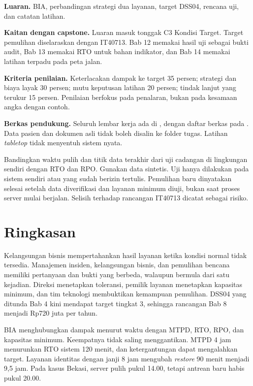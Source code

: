 \textbf{Luaran.} BIA, perbandingan strategi dua layanan, target DSS04, rencana uji, dan catatan
latihan.

\textbf{Kaitan dengan capstone.} Luaran masuk tonggak C3 Kondisi Target. Target pemulihan
diselaraskan dengan IT40713. Bab 12 memakai hasil uji sebagai bukti audit, Bab 13 memakai RTO untuk
bahan indikator, dan Bab 14 memakai latihan terpadu pada peta jalan.

\textbf{Kriteria penilaian.} Keterlacakan dampak ke target 35 persen; strategi dan biaya layak 30
persen; mutu keputusan latihan 20 persen; tindak lanjut yang terukur 15 persen. Penilaian berfokus
pada penalaran, bukan pada kesamaan angka dengan contoh.

\textbf{Berkas pendukung.} Seluruh lembar kerja ada di , dengan daftar
berkas pada . Data pasien dan dokumen asli tidak boleh
disalin ke folder tugas. Latihan \textit{tabletop} tidak menyentuh sistem nyata.

\begin{pendalaman}
Bandingkan waktu pulih dan titik data terakhir dari uji cadangan di lingkungan sendiri dengan RTO
dan RPO. Gunakan data sintetis. Uji hanya dilakukan pada sistem sendiri atau yang sudah berizin
tertulis. Pemulihan baru dinyatakan selesai setelah data diverifikasi dan layanan minimum diuji,
bukan saat proses server mulai berjalan. Selisih terhadap rancangan IT40713 dicatat sebagai risiko.
\end{pendalaman}

\section{Ringkasan}

Kelangsungan bisnis mempertahankan hasil layanan ketika kondisi normal tidak tersedia. Manajemen
insiden, kelangsungan bisnis, dan pemulihan bencana memiliki pertanyaan dan bukti yang berbeda,
walaupun bermula dari satu kejadian. Direksi menetapkan toleransi, pemilik layanan menetapkan
kapasitas minimum, dan tim teknologi membuktikan kemampuan pemulihan. DSS04 yang ditunda Bab 4 kini
mendapat target tingkat 3, sehingga rancangan Bab 8 menjadi Rp720 juta per tahun.

BIA menghubungkan dampak menurut waktu dengan MTPD, RTO, RPO, dan kapasitas minimum. Keempatnya
tidak saling menggantikan. MTPD 4 jam menurunkan RTO sistem 120 menit, dan ketergantungan dapat
mengalahkan target. Layanan identitas dengan janji 8 jam mengubah \textit{restore} 90 menit menjadi
9,5 jam. Pada kasus Bekasi, server pulih pukul 14.00, tetapi antrean baru habis pukul 20.00.

